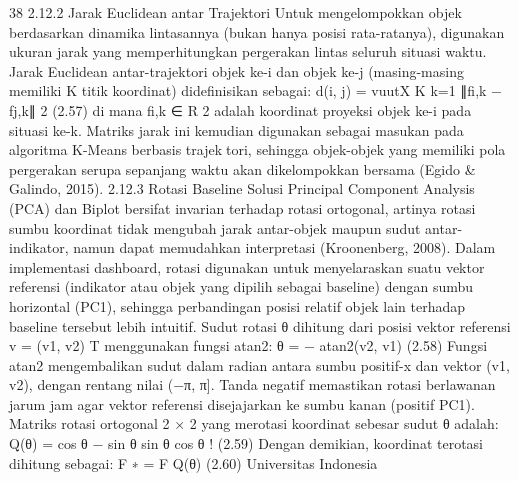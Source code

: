 38
2.12.2 Jarak Euclidean antar Trajektori
Untuk mengelompokkan objek berdasarkan dinamika lintasannya (bukan hanya posisi
rata-ratanya), digunakan ukuran jarak yang memperhitungkan pergerakan lintas seluruh
situasi waktu. Jarak Euclidean antar-trajektori objek ke-i dan objek ke-j (masing-masing
memiliki K titik koordinat) didefinisikan sebagai:
d(i, j) =
vuutX
K
k=1
∥fi,k − fj,k∥
2
(2.57)
di mana fi,k ∈ R
2
adalah koordinat proyeksi objek ke-i pada situasi ke-k. Matriks
jarak ini kemudian digunakan sebagai masukan pada algoritma K-Means berbasis trajektori, sehingga objek-objek yang memiliki pola pergerakan serupa sepanjang waktu akan
dikelompokkan bersama (Egido & Galindo, 2015).
2.12.3 Rotasi Baseline
Solusi Principal Component Analysis (PCA) dan Biplot bersifat invarian terhadap
rotasi ortogonal, artinya rotasi sumbu koordinat tidak mengubah jarak antar-objek maupun
sudut antar-indikator, namun dapat memudahkan interpretasi (Kroonenberg, 2008). Dalam
implementasi dashboard, rotasi digunakan untuk menyelaraskan suatu vektor referensi
(indikator atau objek yang dipilih sebagai baseline) dengan sumbu horizontal (PC1),
sehingga perbandingan posisi relatif objek lain terhadap baseline tersebut lebih intuitif.
Sudut rotasi θ dihitung dari posisi vektor referensi v = (v1, v2)
T menggunakan fungsi
atan2:
θ = − atan2(v2, v1) (2.58)
Fungsi atan2 mengembalikan sudut dalam radian antara sumbu positif-x dan vektor
(v1, v2), dengan rentang nilai (−π, π]. Tanda negatif memastikan rotasi berlawanan jarum
jam agar vektor referensi disejajarkan ke sumbu kanan (positif PC1).
Matriks rotasi ortogonal 2 × 2 yang merotasi koordinat sebesar sudut θ adalah:
Q(θ) = 
cos θ − sin θ
sin θ cos θ
!
(2.59)
Dengan demikian, koordinat terotasi dihitung sebagai:
F
∗ = F Q(θ) (2.60)
Universitas Indonesia


